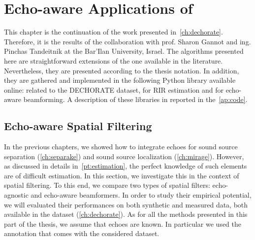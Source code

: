 \chapter{Echo-aware Applications of \dEchorate}\label{ch:dechorateapp}


\vspace{-2.5em}
 \synopsisChDecharateApp



\mynewline
This chapter is the continuation of the work presented in~\cref{ch:dechorate}.
Therefore, it is the results of the collaboration with prof. Sharon Gannot and ing. Pinchas Tandeitnik at the Bar'Ilan University, Israel.
The algorithms presented here are straightforward extensions of the one available in the literature.
Nevertheless, they are presented according to the thesis notation.
In addition, they are  gathered and implemented in the following Python library available online:
 related to the \ac{DECHORATE} dataset,  for \acs{RIR} estimation and  for echo-aware beamforming.
A description of these libraries in reported in the~\cref{ap:code}.

\section{Echo-aware Spatial Filtering}\label{sec:dechorateapp:se}
In the previous chapters, we showed how to integrate echoes for sound source separation (\cref{ch:separake}) and sound source localization (\cref{ch:mirage}).
However, as discussed in details in~\cref{pt:estimation}, the perfect knowledge of such elements are of difficult estimation.
In this section, we investigate this in the context of spatial filtering.
To this end, we compare two types of spatial filters: echo-agnostic and echo-aware beamformers.
In order to study their empirical potential, we will evaluated their performances on both synthetic and measured data, both available in the \dEchorate{} dataset (\cref{ch:dechorate}).
As for all the methods presented in this part of the thesis, we assume that echoes are known.
In particular we used the annotation that comes with the considered dataset.

